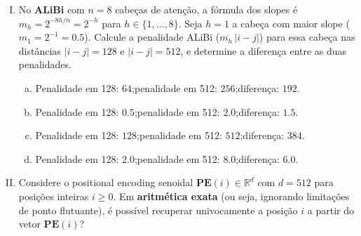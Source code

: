 \documentclass{dlproblemset}
\begin{document}
\begin{enumerate}[I)]
\begin{enumerate}[a)]
    \item Dimensões de $k$ alto (baixa frequência), pois não completam muitas
          rotações dentro de $L_{\mathrm{train}}$.
    \item Todas as dimensões são igualmente afetadas, pois o mesmo fator de escala
          é aplicado uniformemente.
    \item Dimensões de $k$ médio, pois suas frequências estão mais próximas da taxa
          de Nyquist do índice comprimido.
    \item Dimensões de $k$ baixo (alta frequência), pois já completam muitas
          rotações dentro de $L_{\mathrm{train}}$.
\end{enumerate}

\item {} No \textbf{ALiBi} com $n = 8$ cabeças de atenção,
      a fórmula dos slopes é $m_h = 2^{-8h/n} = 2^{-h}$ para $h \in \{1,\ldots,8\}$.
      Seja $h = 1$ a cabeça com maior slope ($m_1 = 2^{-1} = 0.5$).
      Calcule a penalidade ALiBi ($m_h\,|i-j|$) para essa cabeça nas distâncias
      $|i-j| = 128$ e $|i-j| = 512$, e determine a diferença entre as duas penalidades.

\begin{enumerate}[a)]
    \item Penalidade em 128: $64$;\quad penalidade em 512: $256$;\quad diferença: $192$.
    \item Penalidade em 128: $0.5$;\quad penalidade em 512: $2.0$;\quad diferença: $1.5$.
    \item Penalidade em 128: $128$;\quad penalidade em 512: $512$;\quad diferença: $384$.
    \item Penalidade em 128: $2.0$;\quad penalidade em 512: $8.0$;\quad diferença: $6.0$.
\end{enumerate}

\item {} Considere o positional encoding senoidal
      $\mathbf{PE}(i) \in \mathbb{R}^d$ com $d = 512$ para posições inteiras $i \geq 0$.
      Em \textbf{aritmética exata} (ou seja, ignorando limitações de ponto flutuante),
      é possível recuperar univocamente a posição $i$ a partir do vetor $\mathbf{PE}(i)$?


\end{enumerate}
\end{document}
